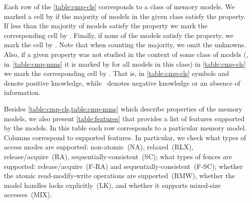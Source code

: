 Each row of the \cref{table:cmp-cls} corresponds to a class of memory models. 
We marked a cell by \cmark\xspace if the majority of models 
in the given class satisfy the property. 
If less than the majority of models satisfy the property we mark 
the corresponding cell by \wmark\xspace.
Finally, if none of the models satisfy the property, we mark the cell by \xmark\xspace. 
Note that when counting the majority, we omit the unknowns.
Also, if a given property was not studied in the context of some class of models 
(\ie, in~\cref{table:cmp-mms} it is marked by \qmark\xspace for all models in this class)
in \cref{table:cmp-cls} we mark the corresponding cell by \xmark. 
That is, in \cref{table:cmp-cls} symbols \cmark\xspace and \wmark\xspace 
denote positive knowledge,
while~\xmark\xspace denotes negative knowledge or
an absence of information.

Besides \cref{table:cmp-cls,table:cmp-mms} which describe 
properties of the memory models, 
we also present \cref{table:features}
that provides a list of features supported by the models.
In this table each row corresponds to a particular memory model. 
Columns correspond to supported features. 
In particular, we check what types of access modes are supported:
non-atomic~(NA), relaxed~(RLX), release/acquire~(RA), sequentially-consistent~(SC); 
what types of fences are supported: release/acquire~(F-RA) 
and sequentially-consistent~(F-SC);
whether the atomic read-modify-write operations are supported~(RMW),
whether the model handles locks explicitly~(LK),
and whether it supports mixed-size accesses~(MIX). 





